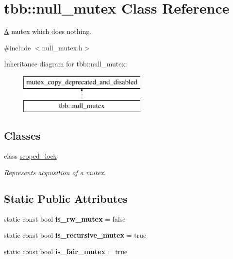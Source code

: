 \hypertarget{classtbb_1_1null__mutex}{}\section{tbb\+:\+:null\+\_\+mutex Class Reference}
\label{classtbb_1_1null__mutex}


\hyperlink{structA}{A} mutex which does nothing.  




{\ttfamily \#include $<$null\+\_\+mutex.\+h$>$}

Inheritance diagram for tbb\+:\+:null\+\_\+mutex\+:\begin{figure}[H]
\begin{center}
\leavevmode
\includegraphics[height=2.000000cm]{classtbb_1_1null__mutex}
\end{center}
\end{figure}
\subsection*{Classes}
\begin{DoxyCompactItemize}
\item 
class \hyperlink{classtbb_1_1null__mutex_1_1scoped__lock}{scoped\+\_\+lock}
\begin{DoxyCompactList}\small\item\em Represents acquisition of a mutex. \end{DoxyCompactList}\end{DoxyCompactItemize}
\subsection*{Static Public Attributes}
\begin{DoxyCompactItemize}
\item 
\hypertarget{classtbb_1_1null__mutex_a20ed8301299d9ec166588401269d1788}{}static const bool {\bfseries is\+\_\+rw\+\_\+mutex} = false\label{classtbb_1_1null__mutex_a20ed8301299d9ec166588401269d1788}

\item 
\hypertarget{classtbb_1_1null__mutex_a49bd7f5da83382e39f898d06cbf0e23e}{}static const bool {\bfseries is\+\_\+recursive\+\_\+mutex} = true\label{classtbb_1_1null__mutex_a49bd7f5da83382e39f898d06cbf0e23e}

\item 
\hypertarget{classtbb_1_1null__mutex_ae4684b268ff379a69cd1fe93718ee7fc}{}static const bool {\bfseries is\+\_\+fair\+\_\+mutex} = true\label{classtbb_1_1null__mutex_ae4684b268ff379a69cd1fe93718ee7fc}

\end{DoxyCompactItemize}


